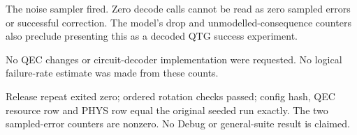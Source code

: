 \begin{figures}
\end{figures}
The noise sampler fired. Zero decode calls cannot be read as zero sampled
errors or successful correction. The model's drop and unmodelled-consequence
counters also preclude presenting this as a decoded QTG success experiment.

No QEC changes or circuit-decoder implementation were requested. No logical
failure-rate estimate was made from these counts.

Release repeat exited zero; ordered rotation checks passed; config hash,
QEC resource row and PHYS row equal the original seeded run exactly.
The two sampled-error counters are nonzero. No Debug or general-suite result
is claimed.
